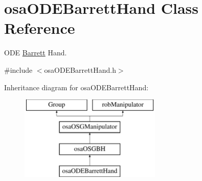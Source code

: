 \hypertarget{classosa_o_d_e_barrett_hand}{\section{osa\-O\-D\-E\-Barrett\-Hand Class Reference}
\label{classosa_o_d_e_barrett_hand}
}


O\-D\-E \hyperlink{struct_barrett}{Barrett} Hand.  




{\ttfamily \#include $<$osa\-O\-D\-E\-Barrett\-Hand.\-h$>$}

Inheritance diagram for osa\-O\-D\-E\-Barrett\-Hand\-:\begin{figure}[H]
\begin{center}
\leavevmode
\includegraphics[height=4.000000cm]{d5/d72/classosa_o_d_e_barrett_hand}
\end{center}
\end{figure}
